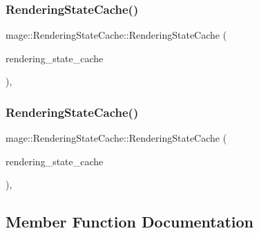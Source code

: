 \subsubsection{\texorpdfstring{Rendering\+State\+Cache()}{RenderingStateCache()}\hspace{0.1cm}{\footnotesize\ttfamily [2/3]}}
{\footnotesize\ttfamily mage\+::\+Rendering\+State\+Cache\+::\+Rendering\+State\+Cache (\begin{DoxyParamCaption}\item[{const \hyperlink{structmage_1_1_rendering_state_cache}{Rendering\+State\+Cache} \&}]{rendering\+\_\+state\+\_\+cache }\end{DoxyParamCaption})\hspace{0.3cm}{\ttfamily [private]}, {\ttfamily [delete]}}

\hypertarget{structmage_1_1_rendering_state_cache_a989dc7c2eebd72a1d90b31e648869b66}{}\label{structmage_1_1_rendering_state_cache_a989dc7c2eebd72a1d90b31e648869b66} 
\subsubsection{\texorpdfstring{Rendering\+State\+Cache()}{RenderingStateCache()}\hspace{0.1cm}{\footnotesize\ttfamily [3/3]}}
{\footnotesize\ttfamily mage\+::\+Rendering\+State\+Cache\+::\+Rendering\+State\+Cache (\begin{DoxyParamCaption}\item[{\hyperlink{structmage_1_1_rendering_state_cache}{Rendering\+State\+Cache} \&\&}]{rendering\+\_\+state\+\_\+cache }\end{DoxyParamCaption})\hspace{0.3cm}{\ttfamily [private]}, {\ttfamily [delete]}}



\subsection{Member Function Documentation}
\hypertarget{structmage_1_1_rendering_state_cache_afa897dcd0b71e4ff8e6ce6d8e31aaa71}{}\label{structmage_1_1_rendering_state_cache_afa897dcd0b71e4ff8e6ce6d8e31aaa71} 
